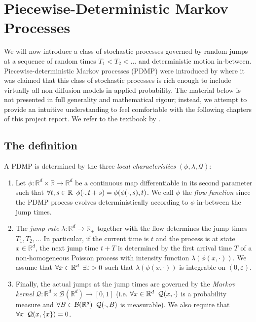 \documentclass[report.tex]{subfiles}
\begin{document}
\section{Piecewise-Deterministic Markov Processes}

We will now introduce a class of stochastic processes governed by random jumps at
a sequence of random times $T_{1} < T_{2} < \dots$ and deterministic motion
in-between. Piecewise-deterministic Markov processes (PDMP) were introduced by
\citet{davis1984piecewise} where it was claimed
that this class of stochastic processes is rich enough to include virtually
all non-diffusion models in applied probability.
The material below is not presented in full generality
and mathematical rigour; instead, we attempt to provide an intuitive
understanding to feel comfortable with the following chapters of this project
report.
We refer to the textbook by \citet{davis1993markov}.

\subsection{The definition}
\label{pdmp-definition}

A PDMP is determined by the three \textit{local characteristics}
$(\phi, \lambda, \mathcal{Q})$:

\begin{enumerate}
  \item Let $\phi : \mathbb{R}^{d} \times \mathbb{R} \to \mathbb{R}^{d}$
        be a continuous map differentiable in its second parameter such that
        $\forall t,s \in \mathbb{R} \enskip
        \phi(\cdot, t + s) = \phi(\phi(\cdot, s), t)$.
        We call $\phi$ the \textit{flow function} since the PDMP process evolves
        deterministically according to $\phi$ in-between the jump times.
  \item The \textit{jump rate}
        $\lambda : \mathbb{R}^{d} \to \mathbb{R}_{+}$
        together with the flow determines the jump times $T_{1}, T_{2}, \dots$
        In particular, if the current time is $t$ and the process is at state
        $x \in \mathbb{R}^{d}$, the next jump time $t + T$ is determined by
        the first arrival time $T$ of a non-homogeneous Poisson process
        with intensity function
        $\lambda(\phi(x, \cdot))$. We assume that
        $\forall x \in \mathbb{R}^{d} \enskip \exists \varepsilon > 0$ such that
        $\lambda(\phi(x, \cdot))$ is integrable on $(0, \varepsilon)$.

  \item Finally, the actual jumps at the jump times are governed by the
        \textit{Markov kernel}
        $\mathcal{Q} : \mathbb{R}^{d} \times \mathcal{B}(\mathbb{R}^{d})
         \to [0, 1]$
        (i.e. $\forall x \in \mathbb{R}^{d} \enskip \mathcal{Q}(x, \cdot)$
        is a probability measure
        and $\forall B \in \mathcal{B}(\mathbb{R}^{d}) \enskip
        \mathcal{Q}(\cdot, B)$ is measurable).
        We also require that $\forall x \enskip \mathcal{Q}(x, \{x\}) = 0$.
\end{enumerate}
\end{document}
